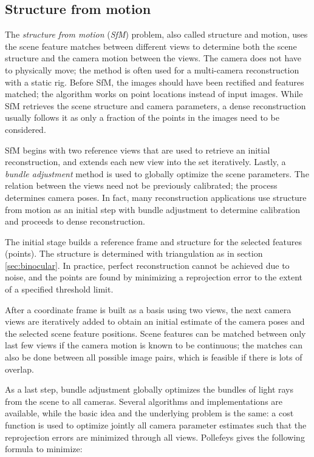 \subsection{Structure from motion} %

The \emph{structure from motion} (\emph{SfM}) problem, also called structure and motion, uses the scene feature matches between different views to determine both the scene structure and the camera motion between the views.
\cite{snavely2006photo,fitzgibbon1998automatic} 
The camera does not have to physically move; the method is often used for a multi-camera reconstruction with a static rig.
Before SfM, the images should have been rectified and features matched; the algorithm works on point locations instead of input images.
While SfM retrieves the scene structure and camera parameters, a dense reconstruction usually follows it as only a fraction of the points in the images need to be considered.

SfM begins with two reference views that are used to retrieve an initial reconstruction, and extends each new view into the set iteratively.
Lastly, a \emph{bundle adjustment} method is used to globally optimize the scene parameters.
The relation between the views need not be previously calibrated; the process determines camera poses.
In fact, many reconstruction applications use structure from motion as an initial step with bundle adjustment to determine calibration and proceeds to dense reconstruction.

The initial stage builds a reference frame and structure for the selected features (points).
The structure is determined with triangulation as in section \ref{sec:binocular}.
In practice, perfect reconstruction cannot be achieved due to noise, and the points are found by minimizing a reprojection error to the extent of a specified threshold limit.

After a coordinate frame is built as a basis using two views, the next camera views are iteratively added to obtain an initial estimate of the camera poses and the selected scene feature positions.
Scene features can be matched between only last few views if the camera motion is known to be continuous;
the matches can also be done between all possible image pairs, which is feasible if there is lots of overlap.

As a last step, bundle adjustment globally optimizes the bundles of light rays from the scene to all cameras.
Several algorithms and implementations are available, while the basic idea and the underlying problem is the same:
a cost function is used to optimize jointly all camera parameter estimates such that the reprojection errors are minimized through all views.
Pollefeys \cite{tutorial} gives the following formula to minimize:

